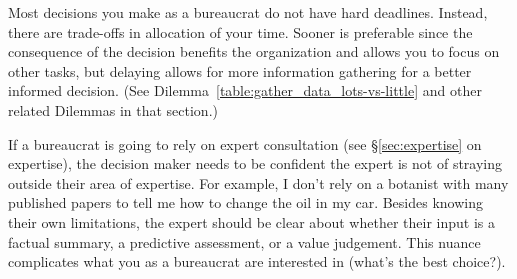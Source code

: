 Most decisions you make as a bureaucrat do not have hard deadlines. Instead, there are trade-offs in allocation of your time. Sooner is preferable since the consequence of the decision benefits the organization and allows you to focus on other tasks, but delaying allows for more information gathering for a better informed decision. (See Dilemma~\ref{table:gather_data_lots-vs-little} and other related Dilemmas in that section.)


If a bureaucrat is going to rely on expert consultation (see \S\ref{sec:expertise} on expertise), the decision maker needs to be confident the expert is not of straying outside their area of expertise. For example, I don't rely on a botanist with many published papers to tell me how to change the oil in my car. 
Besides knowing their own limitations, the expert should be clear about whether their input is a factual summary, a predictive assessment, or a value judgement. This nuance complicates what you as a bureaucrat are interested in (what's the best choice?).

